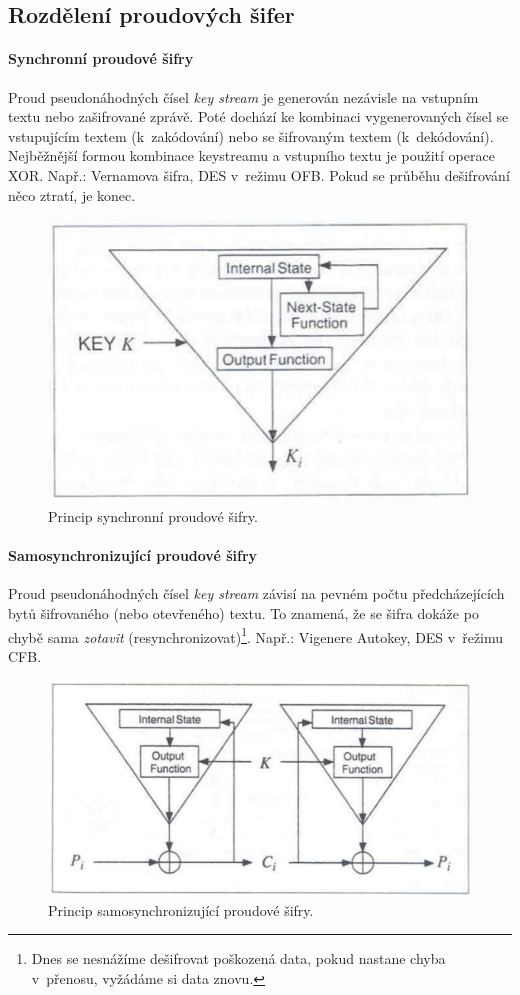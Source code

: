 \subsection{Rozdělení proudových šifer}

\paragraph*{Synchronní proudové šifry} Proud pseudonáhodných čísel \textit{key stream} je generován nezávisle na vstupním textu nebo zašifrované zprávě. Poté dochází ke kombinaci vygenerovaných čísel se vstupujícím textem (k~zakódování) nebo se šifrovaným textem (k~dekódování). Nejběžnější formou kombinace keystreamu a vstupního textu je použití operace XOR. Např.: Vernamova šifra, DES v~režimu OFB. Pokud se průběhu dešifrování něco ztratí, je konec.

\begin{figure}[H]
    \centering
    \includegraphics[width=0.5\linewidth]{proudova_synchronni.png}
    \caption{Princip synchronní proudové šifry.}
\end{figure}

\paragraph*{Samosynchronizující proudové šifry} Proud pseudonáhodných čísel \textit{key stream} závisí na pevném počtu předcházejících bytů šifrovaného (nebo otevřeného) textu. To znamená, že se šifra dokáže po chybě sama \textit{zotavit} (resynchronizovat)\footnote{Dnes se nesnážíme dešifrovat poškozená data, pokud nastane chyba v~přenosu, vyžádáme si data znovu.}. Např.: Vigenere Autokey, DES v~řežimu CFB.

\begin{figure}[H]
    \centering
    \includegraphics[width=0.75\linewidth]{proudova_samosynchronizujici.png}
    \caption{Princip samosynchronizující proudové šifry.}
\end{figure}

